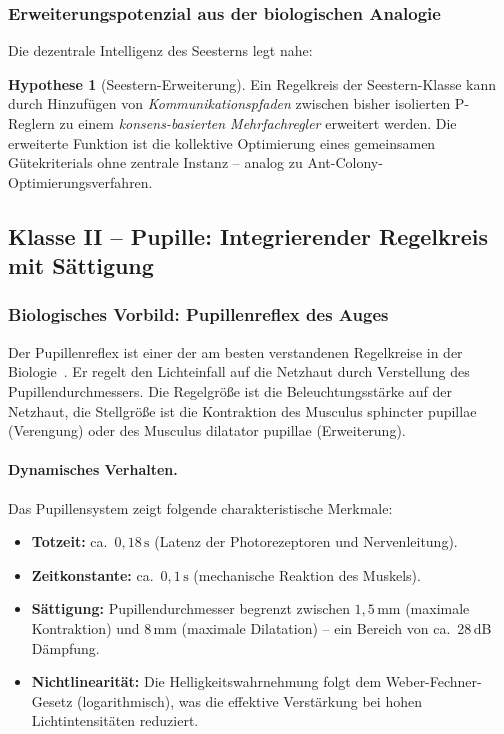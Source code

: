 \documentclass[a4paper,12pt]{article}
\theoremstyle{definition}
\newtheorem{hypothese}{Hypothese}
\begin{document}
\subsubsection{Erweiterungspotenzial aus der biologischen Analogie}

Die dezentrale Intelligenz des Seesterns legt nahe:

\begin{hypothese}[Seestern-Erweiterung]
	Ein Regelkreis der Seestern-Klasse kann durch Hinzufügen von
	\emph{Kommunikationspfaden} zwischen bisher isolierten P-Reglern zu einem
	\emph{konsens-basierten Mehrfachregler} erweitert werden. Die erweiterte
	Funktion ist die kollektive Optimierung eines gemeinsamen Gütekriterials ohne
	zentrale Instanz -- analog zu Ant-Colony-Optimierungsverfahren.
\end{hypothese}

\subsection{Klasse II -- Pupille: Integrierender Regelkreis mit Sättigung}
\label{subsec:klasse_pupille}

\subsubsection{Biologisches Vorbild: Pupillenreflex des Auges}

Der Pupillenreflex ist einer der am besten verstandenen Regelkreise in der
Biologie~\cite{astrom}. Er regelt den Lichteinfall auf die Netzhaut durch
Verstellung des Pupillendurchmessers. Die Regelgröße ist die Beleuchtungsstärke
auf der Netzhaut, die Stellgröße ist die Kontraktion des Musculus sphincter
pupillae (Verengung) oder des Musculus dilatator pupillae (Erweiterung).

\paragraph{Dynamisches Verhalten.}
Das Pupillensystem zeigt folgende charakteristische Merkmale:
\begin{itemize}
	\item \textbf{Totzeit:} ca.\ $0{,}18\,\text{s}$ (Latenz der Photorezeptoren
	und Nervenleitung).
	\item \textbf{Zeitkonstante:} ca.\ $0{,}1\,\text{s}$ (mechanische Reaktion
	des Muskels).
	\item \textbf{Sättigung:} Pupillendurchmesser begrenzt zwischen
	$1{,}5\,\text{mm}$ (maximale Kontraktion) und $8\,\text{mm}$
	(maximale Dilatation) -- ein Bereich von ca.\ 28\,dB Dämpfung.
	\item \textbf{Nichtlinearität:} Die Helligkeitswahrnehmung folgt dem
	Weber-Fechner-Gesetz (logarithmisch), was die effektive Verstärkung
	bei hohen Lichtintensitäten reduziert.
\end{itemize}
\end{document}
